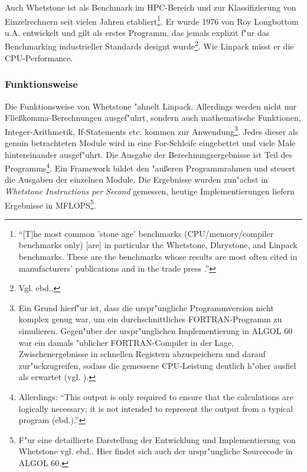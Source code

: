 Auch Whetstone ist als Benchmark im HPC-Bereich und zur Klassifizierung von Einzelrechnern seit vielen Jahren etabliert\footnote{"`[T]he most common 'stone age' benchmarks (CPU/memory/compiler benchmarks only) [are] in particular the Whetstone, Dhrystone, and Linpack benchmarks. These are the benchmarks whose results are most often cited in manufacturers' publications and in the trade press \cite{wei90}."'}. Er wurde 1976 von Roy Longbottom u.A. entwickelt und gilt als erstes Programm, das jemals explizit f"ur das Benchmarking industrieller Standards designt wurde\footnote{Vgl. ebd..}. Wie Linpack misst er die CPU-Performance. 

\subsubsection{Funktionsweise}\label{Funktionsweise Whetstone}

Die Funktionsweise von Whetstone "ahnelt Linpack. Allerdings werden nicht nur Flie\ss komma-Berechnungen ausgef"uhrt, sondern auch mathematische Funktionen, Integer-Arithmetik, If-Statements etc. kommen zur Anwendung\footnote{Ein Grund hierf"ur ist, dass die urspr"ungliche Programmversion nicht komplex genug war, um ein durchschnittliches FORTRAN-Programm zu simulieren. Gegen"uber der urspr"unglichen Implementierung in ALGOL 60 war ein damals "ublicher FORTRAN-Compiler in der Lage, Zwischenergebnisse in schnellen Registern abzuspeichern und darauf zur"uckzugreifen, sodass die gemessene CPU-Leistung deutlich h"oher ausfiel als erwartet (vgl. \cite{cur76}).}. Jedes dieser als genuin betrachteten Module wird in eine For-Schleife eingebettet und viele Male  hintereinander ausgef"uhrt. Die Ausgabe der Berechnungsergebnisse ist Teil des Programms\footnote{Allerdings: "`This output is only required to ensure that the calculations are logically necessary; it is not intended to represent the output from a typical program (ebd.)."'}. Ein Framework bildet den "au\ss eren Programmrahmen und steuert die Ausgaben der einzelnen Module. Die Ergebnisse wurden zun"achst in \textit{Whetstone Instructions per Second} gemessen, heutige Implementierungen liefern Ergebnisse in MFLOPS\footnote{F"ur eine detaillierte Darstellung der Entwicklung und Implementierung von Whetstone vgl. ebd.. Hier findet sich auch der urspr"ungliche Sourcecode in ALGOL 60.}. 

